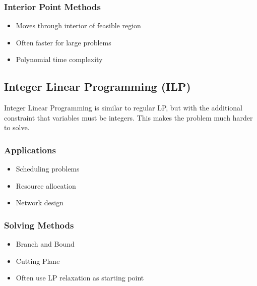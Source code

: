 \documentclass[11pt,a4paper]{article}
\begin{document}
\begin{multicols}{2}
\subsubsection{Interior Point Methods}
\begin{itemize}
    \item Moves through interior of feasible region
    \item Often faster for large problems
    \item Polynomial time complexity
\end{itemize}

\subsection{Integer Linear Programming (ILP)}
Integer Linear Programming is similar to regular LP, but with the additional constraint that variables must be integers. This makes the problem much harder to solve.

\subsubsection{Applications}
\begin{itemize}
    \item Scheduling problems
    \item Resource allocation
    \item Network design
\end{itemize}

\subsubsection{Solving Methods}
\begin{itemize}
    \item Branch and Bound
    \item Cutting Plane
    \item Often use LP relaxation as starting point
\end{itemize}


\end{multicols}
\end{document}
